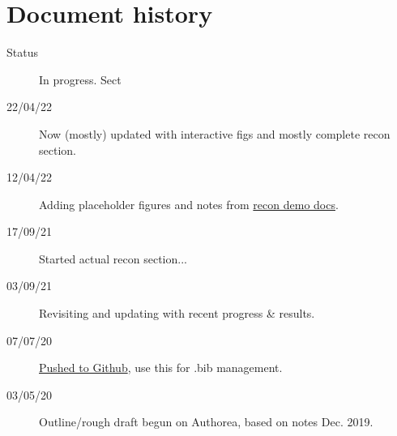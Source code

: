 \section*{Document history}

\begin{description}
\item [{Status}] In progress. Sect
\item [{22/04/22}] Now (mostly) updated with interactive figs and mostly complete recon section.
\item [{12/04/22}] Adding placeholder figures and notes from \href{https://pemtk.readthedocs.io/en/latest/fitting/PEMtk_analysis_demo_150621-tidy.html}{recon demo docs}.
\item [{17/09/21}] Started actual recon section...
\item [{03/09/21}] Revisiting and updating with recent progress \& results.
\item [{07/07/20}] \href{https://github.com/phockett/Extracting-Molecular-Frame-Photoionization-Dynamics-from-Experimental-Data}{Pushed to Github}, use this for .bib management.
\item [{03/05/20}] Outline/rough draft begun on Authorea, based on notes Dec. 2019.
\end{description}